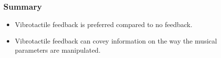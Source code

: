 \documentclass{beamer}
\begin{document}
%

\begin{frame}
\frametitle{Summary}
	\begin{itemize}[<+->]%
	\item Vibrotactile feedback is preferred compared to no feedback.
	\item Vibrotactile feedback can covey information on the way the musical parameters are manipulated. %
	\end{itemize}
\end{frame}
\end{document}
